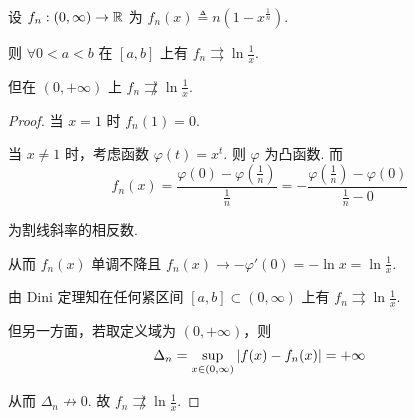 \begin{example}
    设 $f_n:(0,\infty)\to\mathbb{R}$ 为 $f_n(x)\triangleq n(1-x^\frac{1}{n})$.

    则 $\forall 0<a<b$ 在 $[a,b]$ 上有 $f_n\rightrightarrows\ln\frac{1}{x}$.

    但在 $(0,+\infty)$ 上 $f_n\not\rightrightarrows\ln\frac{1}{x}$.
\end{example}
\begin{proof}
    当 $x=1$ 时 $f_n(1)=0$.

    当 $x\ne 1$ 时，考虑函数 $\varphi(t)=x^t$. 则 $\varphi$ 为凸函数. 而
$$
f_n(x)=\frac{\varphi(0)-\varphi(\frac{1}{n})}{\frac{1}{n}}=-\frac{\varphi(\frac{1}{n})-\varphi(0)}{\frac{1}{n}-0}
$$

    为割线斜率的相反数.

    \begin{center}
    \end{center}

    从而 $f_n(x)$ 单调不降且 $f_n(x)\to -\varphi'(0)=-\ln x=\ln\frac{1}{x}$.

    由 Dini 定理知在任何紧区间 $[a,b]\subset(0,\infty)$ 上有 $f_n\rightrightarrows\ln\frac{1}{x}$.

    但另一方面，若取定义域为 $(0,+\infty)$，则
$$
\Delta_n=\sup_{x\in(0,\infty)}\left\lvert{f(x)-f_n(x)}\right\rvert=+\infty
$$

    从而 $\Delta_n\not\to 0$. 故 $f_n\not\rightrightarrows\ln\frac{1}{x}$.
\end{proof}


